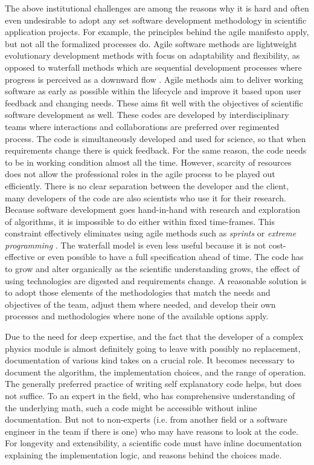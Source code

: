The above institutional challenges are among the reasons why it is
hard and often even undesirable to adopt any set software development
methodology in scientific application projects. For example, the principles
behind the agile manifesto apply, but not all the formalized processes
do. Agile software methods \cite{agile} are lightweight evolutionary development
methods with focus on adaptability and flexibility, as opposed to
waterfall methods which are sequential development processes where
progress is perceived as a downward flow \cite{waterfall}. 
Agile methods aim to deliver working software as early as possible
within the lifecycle and improve it based upon user feedback and
changing needs. These aims fit well with the objectives of scientific
software development as well. These codes are developed by
interdisciplinary teams where interactions and collaborations are
preferred over regimented process. The code is simultaneously
developed and used for science, so that when requirements change there
is quick feedback.  For the  same reason, the code needs to be in
working condition almost all the time. However, scarcity of resources
does not allow the professional roles in the agile process to be
played out efficiently.  There is no clear separation between the
developer and the client, many developers of the code are also
scientists who use it for their research.  Because software
development goes hand-in-hand with research and exploration of
algorithms, it is impossible to do either within fixed
time-frames. This constraint effectively eliminates using agile
methods such as {\em sprints} or {\em extreme programming}
\cite{carver2007software}. The waterfall model is even less useful
because it is not cost-effective or even possible to have a full
specification ahead of time. The code has to grow and alter
organically as the scientific understanding grows, the effect of using
technologies are digested and requirements change. A reasonable
solution is to adopt those elements of the methodologies that match
the needs and objectives of the team, adjust them where needed, and
develop their own processes and methodologies where none of the
available options apply.   

Due to the need for deep expertise, and the fact that the developer of a
complex physics module is almost definitely going to leave with
possibly no replacement, documentation of various kind takes on a
crucial role. It becomes necessary to document the algorithm, the
implementation choices, and the range of operation. The generally
preferred practice of writing self explanatory code helps, but does
not suffice. To an expert in the field, who has comprehensive
understanding of the underlying math, such a code might be accessible
without inline documentation. But not to non-experts (i.e. from
another field or a software engineer in the team if there is one) who
may have reasons to look at the code. For longevity and
extensibility, a scientific code must have inline documentation
explaining the implementation logic, and reasons behind the
choices made.   

